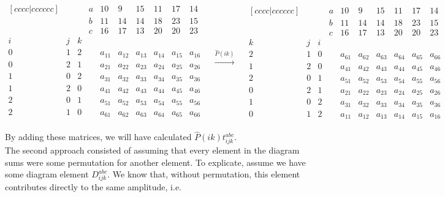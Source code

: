 	\begin{equation*}
	\begin{matrix}[cccc|cccccc]
	&   &   & a & 10 & 9  & 15 & 11 & 17 & 14\\
	&   &   & b & 11 & 14 & 14 & 18 & 23 & 15\\
	&   &   & c & 16 & 17 & 13 & 20 & 20 & 23\\
	i & j & k &   &    &    &    &    &    &   \\ \hline
	0 & 1 & 2 & & a_{11} & a_{12} & a_{13} & a_{14} & a_{15} & a_{16}\\
	0 & 2 & 1 & & a_{21} & a_{22} & a_{23} & a_{24} & a_{25} & a_{26}\\
	1 & 0 & 2 & & a_{31} & a_{32} & a_{33} & a_{34} & a_{35} & a_{36}\\
	1 & 2 & 0 & & a_{41} & a_{42} & a_{43} & a_{44} & a_{45} & a_{46}\\
	2 & 0 & 1 & & a_{51} & a_{52} & a_{53} & a_{54} & a_{55} & a_{56}\\
	2 & 1 & 0 & & a_{61} & a_{62} & a_{63} & a_{64} & a_{65} & a_{66}\\
	\end{matrix}
	\quad\overset{\hat{P}(ik)}{\longrightarrow}\quad
	\begin{matrix}[cccc|cccccc]
	&   &   & a & 10 & 9  & 15 & 11 & 17 & 14\\
	&   &   & b & 11 & 14 & 14 & 18 & 23 & 15\\
	&   &   & c & 16 & 17 & 13 & 20 & 20 & 23\\
	k & j & i &   &    &    &    &    &    &   \\ \hline
	2 & 1 & 0 & & a_{61} & a_{62} & a_{63} & a_{64} & a_{65} & a_{66}\\
	1 & 2 & 0 & & a_{41} & a_{42} & a_{43} & a_{44} & a_{45} & a_{46}\\
	2 & 0 & 1 & & a_{51} & a_{52} & a_{53} & a_{54} & a_{55} & a_{56}\\
	0 & 2 & 1 & & a_{21} & a_{22} & a_{23} & a_{24} & a_{25} & a_{26}\\
	1 & 0 & 2 & & a_{31} & a_{32} & a_{33} & a_{34} & a_{35} & a_{36}\\
	0 & 1 & 2 & & a_{11} & a_{12} & a_{13} & a_{14} & a_{15} & a_{16}
	\end{matrix}
	\end{equation*}
	
	By adding these matrices, we will have calculated $\hat{P}(ik)t_{ijk}^{abc}$.\\
	
	The second approach consisted of assuming that every element in the diagram sums were some permutation for another element. To explicate, assume we have some diagram element $D_{ijk}^{abc}$. We know that, without permutation, this element contributes directly to the same amplitude, i.e.
	
